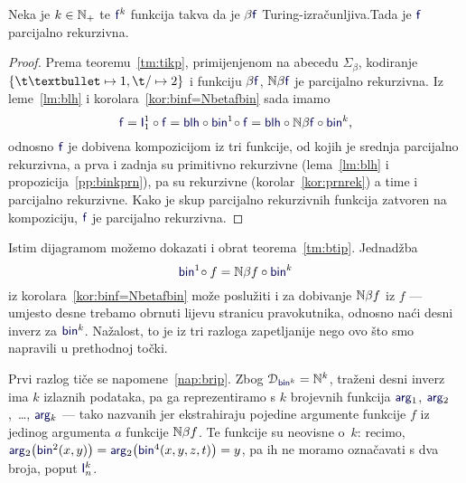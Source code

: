 
\begin{teorem}[{name=[parcijalna rekurzivnost Turing-izračunljivih brojevnih funkcija]}]\label{tm:btip}
Neka je $k\in{\mathbb N}_+$ te $\f f^k$ funkcija takva da je $\beta\f f$ Turing-izračunljiva.\newline Tada je $\f f$ parcijalno rekurzivna.
\end{teorem}
\begin{proof}
    Prema teoremu~\ref{tm:tikp}, primijenjenom na abecedu $\Sigma_\beta$, kodiranje $\{\t\textbullet\mapsto1,\t/\mapsto2\}$ i funkciju $\beta\f f$, $\N\beta\f f$ je parcijalno rekurzivna. Iz leme~\ref{lm:blh} i korolara~\ref{kor:binf=Nbetafbin} sada imamo
\begin{equation}
    \f f=\f I_1^1\circ\f f=\f{blh}\circ\f{bin}^1\!\circ\f f=\f{blh}\circ\N\beta\f f\circ\f{bin}^k\text,
\end{equation}
odnosno $\f f$ je dobivena kompozicijom iz tri funkcije, od kojih je srednja parcijalno rekurzivna, a prva i zadnja su primitivno rekurzivne (lema~\ref{lm:blh} i propozicija~\ref{pp:binkprn}), pa su rekurzivne (korolar~\ref{kor:prnrek}) a time i parcijalno rekurzivne. Kako je skup parcijalno rekurzivnih funkcija zatvoren na kompoziciju, $\f f$ je parcijalno rekurzivna.
\end{proof}

Istim dijagramom možemo dokazati i obrat teorema~\ref{tm:btip}. Jednadžba
\begin{equation}
    \f{bin}^1\!\circ f=\N\beta f\circ\f{bin}^k
\end{equation}
iz korolara~\ref{kor:binf=Nbetafbin} može poslužiti i za dobivanje ${\mathbb N}\beta f$ iz $f$ --- umjesto desne trebamo obrnuti lijevu stranicu pravokutnika, odnosno naći desni inverz za $\f{bin}^k$. Nažalost, to je iz tri razloga zapetljanije nego ovo što smo napravili u prethodnoj točki.

Prvi razlog tiče se napomene~\ref{nap:brip}. Zbog $\dom{\f{bin}^k}=\N^k$, traženi desni inverz ima $k$ izlaznih podataka, pa ga reprezentiramo s $k$ brojevnih funkcija $\f{arg}_1$, $\f{arg}_2$,~\ldots, $\f{arg}_k$ --- tako nazvanih jer ekstrahiraju pojedine argumente funkcije $f$ iz jedinog argumenta $a$ funkcije ${\mathbb N}\beta f$. Te funkcije su neovisne o~$k$: recimo, $\f{arg}_2\bigl(\f{bin}^2(x,y)\bigr)=\f{arg}_2\bigl(\f{bin}^4(x,y,z,t)\bigr)=y$, pa ih ne moramo označavati s dva broja, poput $\f I_n^k$.

